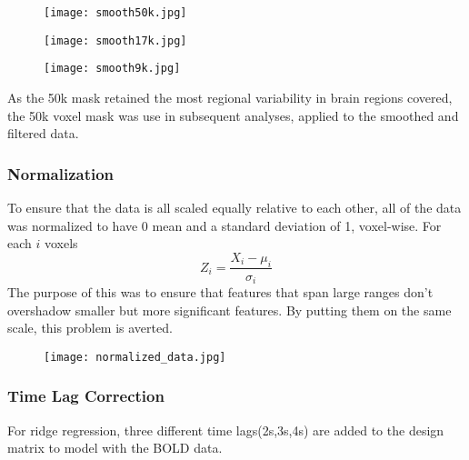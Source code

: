 \begin{figure}[H]
\centering
\begin{minipage}{.5\textwidth}
  \centering
  \texttt{[image: smooth50k.jpg]}
  \label{fig:test1}
\end{minipage}%
\begin{minipage}{.5\textwidth}
  \centering
  \texttt{[image: smooth17k.jpg]}
  \label{fig:test2}
\end{minipage}
\begin{minipage}{.5\textwidth}
  \centering
  \texttt{[image: smooth9k.jpg]}
  \label{fig:test2}
\end{minipage}
\end{figure}

\par As the 50k mask retained the most regional variability in brain regions covered, the 50k voxel mask was use in subsequent analyses, applied to the smoothed and filtered data.

\subsubsection{Normalization}
\par To ensure that the data is all scaled equally relative to each other, all of the data was normalized to have 0 mean and a standard deviation of 1, voxel-wise. For each $i$ voxels
$$ Z_i = \frac{X_i - \mu_i}{\sigma_i} $$  
The purpose of this was to ensure that features that span large ranges don't overshadow smaller but more significant features. By putting them on the same scale, this problem is averted.
\begin{figure}
  \centering
  \texttt{[image: normalized\_data.jpg]}
  \label{fig:test1}
\end{figure}


\subsubsection{Time Lag Correction}
\par For ridge regression, three different time lags(2s,3s,4s) are added to the design matrix to model with the BOLD data.

\break
